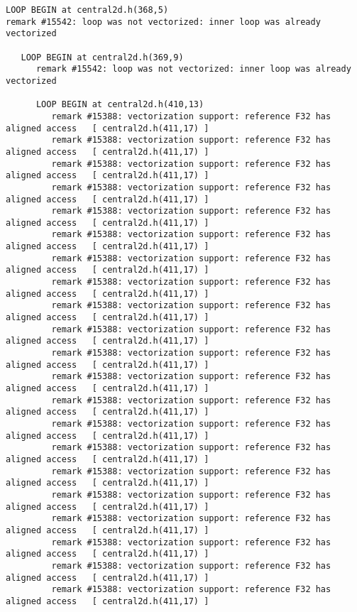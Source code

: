 {\tiny
\begin{lstlisting}
LOOP BEGIN at central2d.h(368,5)
remark #15542: loop was not vectorized: inner loop was already vectorized

   LOOP BEGIN at central2d.h(369,9)
      remark #15542: loop was not vectorized: inner loop was already vectorized

      LOOP BEGIN at central2d.h(410,13)
         remark #15388: vectorization support: reference F32 has aligned access   [ central2d.h(411,17) ]
         remark #15388: vectorization support: reference F32 has aligned access   [ central2d.h(411,17) ]
         remark #15388: vectorization support: reference F32 has aligned access   [ central2d.h(411,17) ]
         remark #15388: vectorization support: reference F32 has aligned access   [ central2d.h(411,17) ]
         remark #15388: vectorization support: reference F32 has aligned access   [ central2d.h(411,17) ]
         remark #15388: vectorization support: reference F32 has aligned access   [ central2d.h(411,17) ]
         remark #15388: vectorization support: reference F32 has aligned access   [ central2d.h(411,17) ]
         remark #15388: vectorization support: reference F32 has aligned access   [ central2d.h(411,17) ]
         remark #15388: vectorization support: reference F32 has aligned access   [ central2d.h(411,17) ]
         remark #15388: vectorization support: reference F32 has aligned access   [ central2d.h(411,17) ]
         remark #15388: vectorization support: reference F32 has aligned access   [ central2d.h(411,17) ]
         remark #15388: vectorization support: reference F32 has aligned access   [ central2d.h(411,17) ]
         remark #15388: vectorization support: reference F32 has aligned access   [ central2d.h(411,17) ]
         remark #15388: vectorization support: reference F32 has aligned access   [ central2d.h(411,17) ]
         remark #15388: vectorization support: reference F32 has aligned access   [ central2d.h(411,17) ]
         remark #15388: vectorization support: reference F32 has aligned access   [ central2d.h(411,17) ]
         remark #15388: vectorization support: reference F32 has aligned access   [ central2d.h(411,17) ]
         remark #15388: vectorization support: reference F32 has aligned access   [ central2d.h(411,17) ]
         remark #15388: vectorization support: reference F32 has aligned access   [ central2d.h(411,17) ]
         remark #15388: vectorization support: reference F32 has aligned access   [ central2d.h(411,17) ]
         remark #15388: vectorization support: reference F32 has aligned access   [ central2d.h(411,17) ]

\end{lstlisting}}
